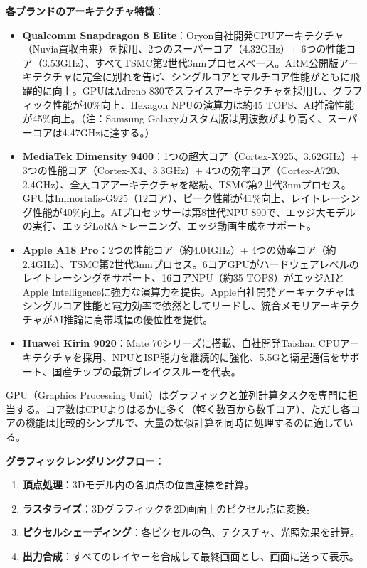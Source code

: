 \textbf{各ブランドのアーキテクチャ特徴}：

\begin{itemize}
  \item \textbf{Qualcomm Snapdragon 8 Elite}：Oryon自社開発CPUアーキテクチャ（Nuvia買収由来）を採用、2つのスーパーコア（4.32GHz）+ 6つの性能コア（3.53GHz）、すべてTSMC第2世代3nmプロセスベース。ARM公開版アーキテクチャに完全に別れを告げ、シングルコアとマルチコア性能がともに飛躍的に向上。GPUはAdreno 830でスライスアーキテクチャを採用し、グラフィック性能が40\%向上、Hexagon NPUの演算力は約45 TOPS、AI推論性能が45\%向上。（注：Samsung Galaxyカスタム版は周波数がより高く、スーパーコアは4.47GHzに達する。）
  \item \textbf{MediaTek Dimensity 9400}：1つの超大コア（Cortex-X925、3.62GHz）+ 3つの性能コア（Cortex-X4、3.3GHz）+ 4つの効率コア（Cortex-A720、2.4GHz）、全大コアアーキテクチャを継続、TSMC第2世代3nmプロセス。GPUはImmortalis-G925（12コア）、ピーク性能が41\%向上、レイトレーシング性能が40\%向上。AIプロセッサーは第8世代NPU 890で、エッジ大モデルの実行、エッジLoRAトレーニング、エッジ動画生成をサポート。
  \item \textbf{Apple A18 Pro}：2つの性能コア（約4.04GHz）+ 4つの効率コア（約2.4GHz）、TSMC第2世代3nmプロセス。6コアGPUがハードウェアレベルのレイトレーシングをサポート、16コアNPU（約35 TOPS）がエッジAIとApple Intelligenceに強力な演算力を提供。Apple自社開発アーキテクチャはシングルコア性能と電力効率で依然としてリードし、統合メモリアーキテクチャがAI推論に高帯域幅の優位性を提供。
  \item \textbf{Huawei Kirin 9020}：Mate 70シリーズに搭載、自社開発Taishan CPUアーキテクチャを採用、NPUとISP能力を継続的に強化、5.5Gと衛星通信をサポート、国産チップの最新ブレイクスルーを代表。
\end{itemize}


GPU（Graphics Processing Unit）はグラフィックと並列計算タスクを専門に担当する。コア数はCPUよりはるかに多く（軽く数百から数千コア）、ただし各コアの機能は比較的シンプルで、大量の類似計算を同時に処理するのに適している。

\textbf{グラフィックレンダリングフロー}：

\begin{enumerate}
  \item \textbf{頂点処理}：3Dモデル内の各頂点の位置座標を計算。
  \item \textbf{ラスタライズ}：3Dグラフィックを2D画面上のピクセル点に変換。
  \item \textbf{ピクセルシェーディング}：各ピクセルの色、テクスチャ、光照効果を計算。
  \item \textbf{出力合成}：すべてのレイヤーを合成して最終画面とし、画面に送って表示。
\end{enumerate}


